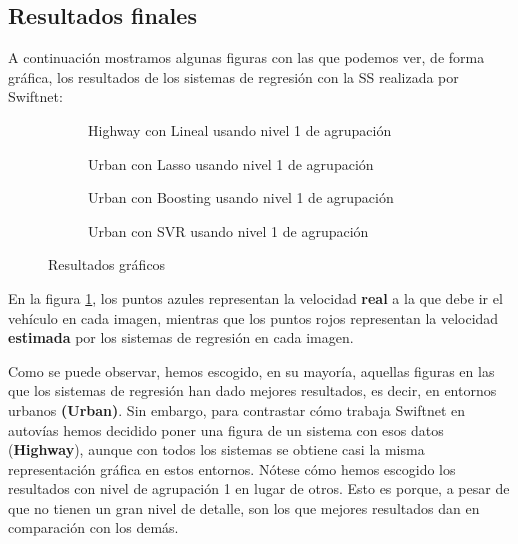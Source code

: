 
\subsection{Resultados finales}

A continuación mostramos algunas figuras con las que podemos ver, de forma gráfica, los resultados de los sistemas de regresión con la \ac{SS} realizada por Swiftnet:

\begin{figure}[H]
  \centering
  \begin{subfigure}[b]{0.45\linewidth}
    \caption{Highway con Lineal usando nivel 1 de agrupación}
  \end{subfigure}
    \begin{subfigure}[b]{0.425\linewidth}
    \caption{Urban con Lasso usando nivel 1 de agrupación}
  \end{subfigure}
    \begin{subfigure}[b]{0.45\linewidth}
    \caption{Urban con Boosting usando nivel 1 de agrupación}
  \end{subfigure}
    \begin{subfigure}[b]{0.45\linewidth}
    \caption{Urban con SVR usando nivel 1 de agrupación}
  \end{subfigure}
  \caption{Resultados gráficos}
  \label{fig:grafs}
\end{figure}

En la figura \ref{fig:grafs}, los puntos azules representan la velocidad \textbf{real} a la que debe ir el vehículo en cada imagen, mientras que los puntos rojos representan la velocidad \textbf{estimada} por los sistemas de regresión en cada imagen.

Como se puede observar, hemos escogido, en su mayoría, aquellas figuras en las que los sistemas de regresión han dado mejores resultados, es decir, en entornos urbanos \textbf{(Urban)}. Sin embargo, para contrastar cómo trabaja Swiftnet en autovías hemos decidido poner una figura de un sistema con esos datos (\textbf{Highway}), aunque con todos los sistemas se obtiene casi la misma representación gráfica en estos entornos. Nótese cómo hemos escogido los resultados con nivel de agrupación 1 en lugar de otros. Esto es porque, a pesar de que no tienen un gran nivel de detalle, son los que mejores resultados dan en comparación con los demás.

